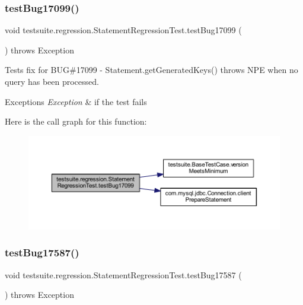 \subsubsection{\texorpdfstring{test\+Bug17099()}{testBug17099()}}
{\footnotesize\ttfamily void testsuite.\+regression.\+Statement\+Regression\+Test.\+test\+Bug17099 (\begin{DoxyParamCaption}{ }\end{DoxyParamCaption}) throws Exception}

Tests fix for B\+UG\#17099 -\/ Statement.\+get\+Generated\+Keys() throws N\+PE when no query has been processed.


\begin{DoxyExceptions}{Exceptions}
{\em Exception} & if the test fails \\
\hline
\end{DoxyExceptions}
Here is the call graph for this function\+:
\nopagebreak
\begin{figure}[H]
\begin{center}
\leavevmode
\includegraphics[width=350pt]{classtestsuite_1_1regression_1_1_statement_regression_test_af66916471e845ecaf25d5a2e0e3b67eb_cgraph}
\end{center}
\end{figure}
\mbox{\label{classtestsuite_1_1regression_1_1_statement_regression_test_a31f8a70535a902a36164d60c222d0430}} 
\subsubsection{\texorpdfstring{test\+Bug17587()}{testBug17587()}}
{\footnotesize\ttfamily void testsuite.\+regression.\+Statement\+Regression\+Test.\+test\+Bug17587 (\begin{DoxyParamCaption}{ }\end{DoxyParamCaption}) throws Exception}

